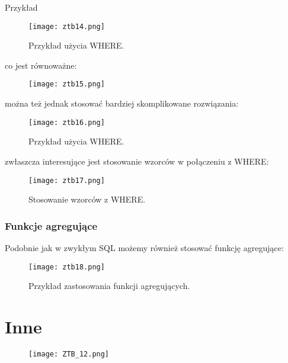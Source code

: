 \documentclass[a4paper,15pt]{article}
\newcommand{\egz}[2]{
    \begin{tcolorbox}[colback=mRed!5!white,colframe=mRed,title={Egzamin #1}]
        #2
    \end{tcolorbox}
}
\begin{document}
Przykład
\begin{figure}[H]
\centering
  \texttt{[image: ztb14.png]}
  \caption{Przykład użycia WHERE.}
  \label{fig:nodes}
\end{figure}

co jest równoważne:
\begin{figure}[H]
\centering
  \texttt{[image: ztb15.png]}
  \label{fig:nodes}
\end{figure}

można też jednak stosować bardziej skomplikowane rozwiązania:
\begin{figure}[H]
\centering
  \texttt{[image: ztb16.png]}
  \caption{Przykład użycia WHERE.}
  \label{fig:nodes}
\end{figure}

zwłaszcza interesujące jest stosowanie wzorców w połączeniu z WHERE:
\begin{figure}[H]
\centering
  \texttt{[image: ztb17.png]}
  \caption{Stosowanie wzorców z WHERE.}
  \label{fig:nodes}
\end{figure}


\subsubsection{Funkcje agregujące}

Podobnie jak w zwykłym SQL możemy również stosować funkcję agregujące:
\begin{figure}[H]
\centering
  \texttt{[image: ztb18.png]}
  \caption{Przykład zastosowania funkcji agregujących.}
  \label{fig:nodes}
\end{figure}


\newpage
\section{Inne}

\egz{}{
\begin{figure}[H]
\centering
  \texttt{[image: ZTB\_12.png]}
\end{figure}
}
\end{document}
